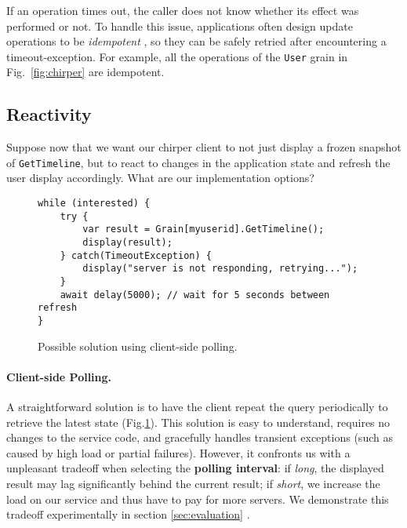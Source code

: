 If an operation times out, the caller does not know whether its effect was performed or not. To handle this issue, applications often design update operations to be \emph{idempotent} \cite{kapil}, so they can be safely retried after encountering a timeout-exception. For example, all the operations of the \lstinline|User| grain in Fig.~\ref{fig:chirper} are idempotent.

\subsection{Reactivity}

Suppose now that we want our chirper client to not just display a frozen snapshot of \lstinline|GetTimeline|, but to react to changes in the application state and refresh the user display accordingly. What are our implementation options? 

\begin{figure}
\begin{lstlisting}
while (interested) {
	try {
		var result = Grain[myuserid].GetTimeline();
		display(result);
	} catch(TimeoutException) { 
		display("server is not responding, retrying...");
	}  
	await delay(5000); // wait for 5 seconds between refresh
}
\end{lstlisting}
\caption{Possible solution using client-side polling.}\label{fig:polling}
\end{figure}

\paragraph{Client-side Polling. } A straightforward solution is to have the client repeat the query periodically to retrieve the latest state (Fig.\ref{fig:polling}). This solution is easy to understand, requires no changes to the service code, and gracefully handles transient exceptions (such as caused by high load or partial failures). However, it confronts us with a unpleasant tradeoff when selecting the \textbf{polling interval}: if \emph{long}, the displayed result may lag significantly behind the current result; if \emph{short}, we increase the load on our service and thus have to pay for more servers. We demonstrate this tradeoff experimentally in section \ref{sec:evaluation} .

